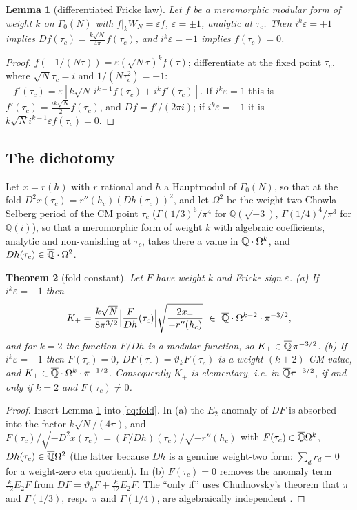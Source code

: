 \documentclass[11pt]{amsart}
\newtheorem{theorem}{Theorem}[section]
\newtheorem{lemma}[theorem]{Lemma}
\theoremstyle{definition}
\theoremstyle{remark}
\newcommand{\Q}{\mathbb Q}\newcommand{\Z}{\mathbb Z}\newcommand{\R}{\mathbb R}\newcommand{\C}{\mathbb C}\newcommand{\HH}{\mathbb H}
\begin{document}
\begin{lemma}[differentiated Fricke law]\label{lem:fricke}
Let $f$ be a meromorphic modular form of weight $k$ on $\Gamma_0(N)$ with $f|_kW_N=\varepsilon f$, $\varepsilon=\pm1$, analytic at $\tau_c$. Then $i^k\varepsilon=+1$ implies $Df(\tau_c)=\frac{k\sqrt N}{4\pi}f(\tau_c)$, and $i^k\varepsilon=-1$ implies $f(\tau_c)=0$.
\end{lemma}
\begin{proof}
$f(-1/(N\tau))=\varepsilon(\sqrt N\tau)^kf(\tau)$; differentiate at the fixed point $\tau_c$, where $\sqrt N\tau_c=i$ and $1/(N\tau_c^2)=-1$: $-f'(\tau_c)=\varepsilon[k\sqrt N\,i^{k-1}f(\tau_c)+i^kf'(\tau_c)]$. If $i^k\varepsilon=1$ this is $f'(\tau_c)=\frac{ik\sqrt N}2f(\tau_c)$, and $Df=f'/(2\pi i)$; if $i^k\varepsilon=-1$ it is $k\sqrt N i^{k-1}\varepsilon f(\tau_c)=0$.
\end{proof}

\subsection{The dichotomy}
Let $x=r(h)$ with $r$ rational and $h$ a Hauptmodul of $\Gamma_0(N)$, so that at the fold $D^2x(\tau_c)=r''(h_c)(Dh(\tau_c))^2$, and let $\Omega^2$ be the weight-two Chowla--Selberg period of the CM point $\tau_c$ ($\Gamma(1/3)^6/\pi^4$ for $\Q(\sqrt{-3})$, $\Gamma(1/4)^4/\pi^3$ for $\Q(i)$), so that a meromorphic form of weight $k$ with algebraic coefficients, analytic and non-vanishing at $\tau_c$, takes there a value in $\Ob\cdot\Omega^k$, and $Dh(\tau_c)\in\Ob\cdot\Omega^2$.

\begin{theorem}[fold constant]\label{thm:dichotomy}
Let $F$ have weight $k$ and Fricke sign $\varepsilon$. (a) If $i^k\varepsilon=+1$ then
$$K_+=\frac{k\sqrt N}{8\pi^{3/2}}\Bigl|\frac F{Dh}(\tau_c)\Bigr|\sqrt{\frac{2x_+}{-r''(h_c)}}\ \in\ \Ob\cdot\Omega^{k-2}\cdot\pi^{-3/2},$$
and for $k=2$ the function $F/Dh$ is a modular function, so $K_+\in\Ob\,\pi^{-3/2}$. (b) If $i^k\varepsilon=-1$ then $F(\tau_c)=0$, $DF(\tau_c)=\vartheta_kF(\tau_c)$ is a weight-$(k+2)$ CM value, and $K_+\in\Ob\cdot\Omega^{k}\cdot\pi^{-1/2}$. Consequently $K_+$ is elementary, i.e. in $\Ob\pi^{-3/2}$, if and only if $k=2$ and $F(\tau_c)\ne0$.
\end{theorem}
\begin{proof}
Insert Lemma \ref{lem:fricke} into \eqref{eq:fold}. In (a) the $E_2$-anomaly of $DF$ is absorbed into the factor $k\sqrt N/(4\pi)$, and $F(\tau_c)/\sqrt{-D^2x(\tau_c)}=(F/Dh)(\tau_c)/\sqrt{-r''(h_c)}$ with $F(\tau_c)\in\Ob\Omega^k$, $Dh(\tau_c)\in\Ob\Omega^2$ (the latter because $Dh$ is a genuine weight-two form: $\sum_dr_d=0$ for a weight-zero eta quotient). In (b) $F(\tau_c)=0$ removes the anomaly term $\frac k{12}E_2F$ from $DF=\vartheta_kF+\frac k{12}E_2F$. The ``only if'' uses Chudnovsky's theorem that $\pi$ and $\Gamma(1/3)$, resp.\ $\pi$ and $\Gamma(1/4)$, are algebraically independent \cite{Chudnovsky}.
\end{proof}
\end{document}
